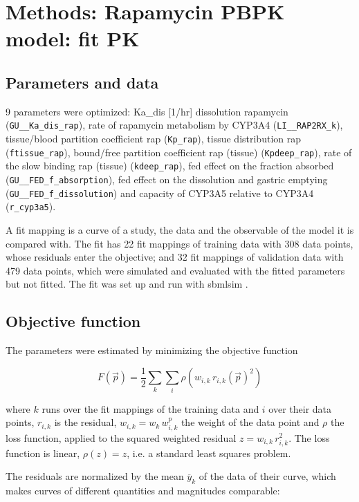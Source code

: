 \section{Methods: Rapamycin PBPK model: fit PK}

\subsection{Parameters and data}

9 parameters were optimized: Ka\_dis [1/hr] dissolution rapamycin (\texttt{GU\_\_Ka\_dis\_rap}), rate of rapamycin metabolism by CYP3A4 (\texttt{LI\_\_RAP2RX\_k}), tissue/blood partition coefficient rap (\texttt{Kp\_rap}), tissue distribution rap (\texttt{ftissue\_rap}), bound/free partition coefficient rap (tissue) (\texttt{Kpdeep\_rap}), rate of the slow binding rap (tissue) (\texttt{kdeep\_rap}), fed effect on the fraction absorbed (\texttt{GU\_\_FED\_f\_absorption}), fed effect on the dissolution and gastric emptying (\texttt{GU\_\_FED\_f\_dissolution}) and capacity of CYP3A5 relative to CYP3A4 (\texttt{r\_cyp3a5}).

A fit mapping is a curve of a study, the data and the observable of the model it is compared with. The fit has 22 fit mappings of training data with 308 data points, whose residuals enter the objective; and 32 fit mappings of validation data with 479 data points, which were simulated and evaluated with the fitted parameters but not fitted. The fit was set up and run with sbmlsim \cite{Koenig2026_sbmlsim}.

\subsection{Objective function}

The parameters were estimated by minimizing the objective function

\begin{equation}
F(\vec{p}) = \frac{1}{2} \sum_{k} \sum_{i} \rho\left(w_{i,k}\, r_{i,k}(\vec{p})^2\right)
\end{equation}

where $k$ runs over the fit mappings of the training data and $i$ over their data points, $r_{i,k}$ is the residual, $w_{i,k} = w_k\, w^{p}_{i,k}$ the weight of the data point and $\rho$ the loss function, applied to the squared weighted residual $z = w_{i,k}\, r_{i,k}^2$. The loss function is linear, $\rho(z) = z$, i.e. a standard least squares problem.

The residuals are normalized by the mean $\overline{y}_k$ of the data of their curve, which makes curves of different quantities and magnitudes comparable:

